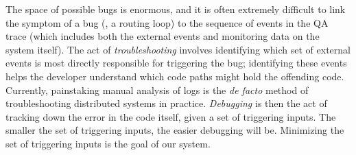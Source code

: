 The space of possible bugs is enormous, and it is often extremely difficult to link the
symptom of a bug (\eg, a routing loop) to the sequence of events in the QA trace (which includes both the external events and monitoring data on the system itself). The act of {\em troubleshooting} involves identifying which set of external events is most directly responsible for triggering the bug; identifying these events helps the developer understand which code paths might hold the offending code. Currently, painstaking manual analysis of logs is the {\em de facto} method of troubleshooting distributed systems in practice.
{\em Debugging} is then the act of tracking down the error in the code itself, given a set
of triggering inputs. The smaller the set of triggering inputs, the easier debugging will
be. Minimizing the set of triggering inputs is the goal of our system.


